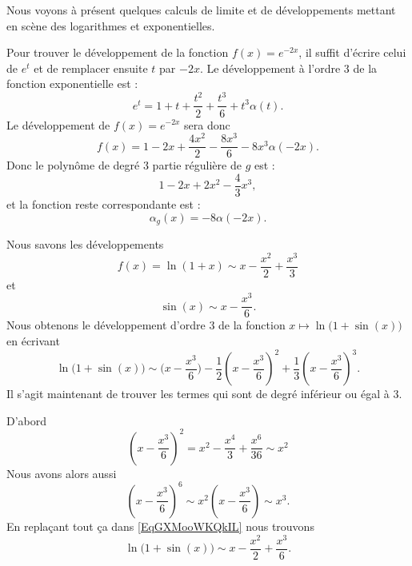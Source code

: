 Nous voyons à présent quelques calculs de limite et de développements mettant en scène des logarithmes et exponentielles.

\begin{example}\label{compose1}
	Pour trouver le développement de la fonction \( f(x)= e^{-2x}\), il suffit d'écrire celui de \( e^t\) et de remplacer ensuite \( t\) par \( -2x\). Le développement à l'ordre \( 3\) de la fonction exponentielle est :
	\begin{equation}
		e^t=1+t+\frac{ t^2 }{2}+\frac{ t^3 }{ 6 }+t^3\alpha(t).
	\end{equation}
	Le développement de \( f(x)= e^{-2x}\) sera donc
	\begin{equation}
		f(x)=1-2x+\frac{ 4x^2 }{ 2 }-\frac{ 8x^3 }{ 6 }-8x^3\alpha(-2x).
	\end{equation}
	Donc le polynôme de degré \( 3\) partie régulière de \( g\) est :
	\begin{equation}
		1-2x+2x^2-\frac{ 4 }{ 3 }x^3,
	\end{equation}
	et la fonction reste correspondante est :
	\begin{equation}
		\alpha_g(x)=-8\alpha(-2x).
	\end{equation}
\end{example}

\begin{example}
	Nous savons les développements
	\begin{equation}
		f(x)=\ln(1+x)\sim x-\frac{ x^2 }{ 2 }+\frac{ x^3 }{ 3 }
	\end{equation}
	et
	\begin{equation}
		\sin(x)\sim x-\frac{ x^3 }{ 6 }.
	\end{equation}
	Nous obtenons le développement d'ordre \( 3\) de la fonction \( x\mapsto \ln\big( 1+\sin(x) \big)\) en écrivant
	\begin{equation}    \label{EqGXMooWKQkIL}
		\ln\big( 1+\sin(x) \big)\sim \big( x-\frac{ x^3 }{ 6 } \big)-\frac{ 1 }{2}\left( x-\frac{ x^3 }{ 6 } \right)^2+\frac{1}{ 3 }\left( x-\frac{ x^3 }{ 6 } \right)^3.
	\end{equation}
	Il s'agit maintenant de trouver les termes qui sont de degré inférieur ou égal à \( 3\).

	D'abord
	\begin{equation}
		\left( x-\frac{ x^3 }{ 6 } \right)^2=x^2-\frac{ x^4 }{ 3 }+\frac{ x^6 }{ 36 }\sim x^2
	\end{equation}
	Nous avons alors aussi
	\begin{equation}
		\left( x-\frac{ x^3 }{ 6 } \right)^6\sim x^2\left( x-\frac{ x^3 }{ 6 } \right)\sim x^3.
	\end{equation}
	En replaçant tout ça dans \eqref{EqGXMooWKQkIL} nous trouvons
	\begin{equation}
		\ln\big( 1+\sin(x) \big)\sim x-\frac{ x^2 }{2}+\frac{ x^3 }{ 6 }.
	\end{equation}
\end{example}

